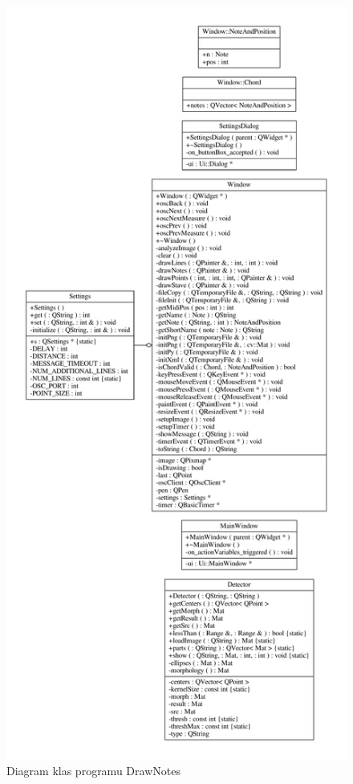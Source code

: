 \documentclass[polish,thesis,12pt]{dcsbook}
\begin{document}
\newpage
\begin{figure}[H]
  \centering
  \includegraphics[scale=0.45,bb=0 0 688 1519]{img/graph.pdf}
  \caption{Diagram klas programu DrawNotes}
  \label{uml}
\end{figure}
\end{document}
